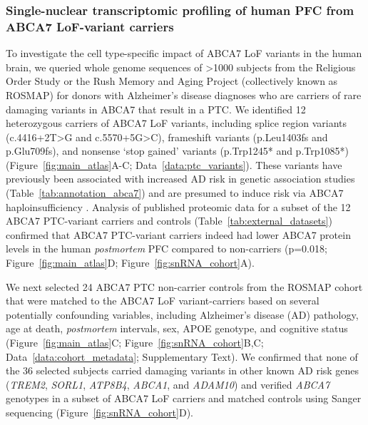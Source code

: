 \subsubsection{Single-nuclear transcriptomic profiling of human PFC from ABCA7 LoF-variant carriers} 
To investigate the cell type-specific impact of ABCA7 LoF variants in the human brain, we queried whole genome sequences of >1000 subjects from the Religious Order Study or the Rush Memory and Aging Project (collectively known as ROSMAP) for donors with Alzheimer’s disease diagnoses who are carriers of rare damaging variants in ABCA7 that result in a PTC. We identified 12 heterozygous carriers of ABCA7 LoF variants, including splice region variants (c.4416+2T>G and c.5570+5G>C), frameshift variants (p.Leu1403fs and p.Glu709fs), and nonsense ‘stop gained’ variants (p.Trp1245* and p.Trp1085*) (Figure~\ref{fig:main_atlas}A-C; Data~\ref{data:ptc_variants}). These variants have previously been associated with increased AD risk in genetic association studies (Table~\ref{tab:annotation_abca7}) \cite{Steinberg2015-mu,Holstege2022-vp} and are presumed to induce risk via ABCA7 haploinsufficiency \cite{Duchateau2024-rf}. Analysis of published proteomic data for a subset of the 12 ABCA7 PTC-variant carriers and controls \cite{Johnson2020-ip} (Table~\ref{tab:external_datasets}) confirmed that ABCA7 PTC-variant carriers indeed had lower ABCA7 protein levels in the human \textit{postmortem} PFC compared to non-carriers (p=0.018; Figure~\ref{fig:main_atlas}D; Figure~\ref{fig:snRNA_cohort}A). 

We next selected 24 ABCA7 PTC non-carrier controls from the ROSMAP cohort that were matched to the ABCA7 LoF variant-carriers based on several potentially confounding variables, including Alzheimer's disease (AD) pathology, age at death, \textit{postmortem} intervals, sex, APOE genotype, and cognitive status (Figure~\ref{fig:main_atlas}C; Figure~\ref{fig:snRNA_cohort}B,C; Data~\ref{data:cohort_metadata}; Supplementary Text). We confirmed that none of the 36 selected subjects carried damaging variants in other known AD risk genes (\textit{TREM2}, \textit{SORL1}, \textit{ATP8B4}, \textit{ABCA1}, and \textit{ADAM10}) \cite{Holstege2022-vp} and verified \textit{ABCA7} genotypes in a subset of ABCA7 LoF carriers and matched controls using Sanger sequencing (Figure~\ref{fig:snRNA_cohort}D).

